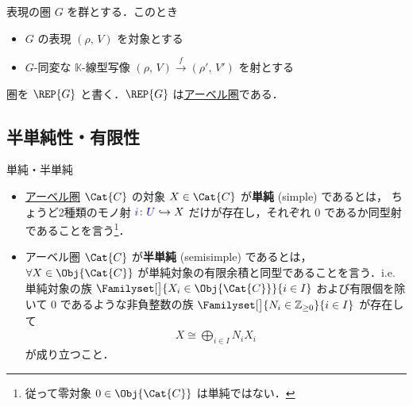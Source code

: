 \documentclass[TQFT_main]{subfiles}
\begin{document}
    \begin{myexample}[label=def:Rep]{表現の圏}
        $G$ を群とする．このとき
        \begin{itemize}
            \item $G$ の表現 $(\rho,\, V)$ を対象とする
            \item $G$-同変な $\mathbb{K}$-線型写像 $(\rho,\, V) \xrightarrow{f} (\rho',\, V')$ を射とする
        \end{itemize}
        圏を $\REP{G}$ と書く．$\REP{G}$ は\hyperref[def:additive-cat]{アーベル圏}である．
    \end{myexample}

    \subsection{半単純性・有限性}

    \begin{mydef}[label=def:semisimple-cat]{単純・半単純}
        \begin{itemize}
            \item \hyperref[def:additive-cat]{アーベル圏} $\Cat{C}$ の対象 $X \in \Cat{C}$ が\textbf{単純} (simple) であるとは，
            ちょうど2種類のモノ射 $\textcolor{blue}{i} \colon \textcolor{blue}{U} \hookrightarrow X$ だけが存在し，それぞれ $0$ であるか同型射であることを言う\footnote{従って零対象 $0 \in \Obj{\Cat{C}}$ は単純ではない．}．
            \item アーベル圏 $\Cat{C}$ が\textbf{半単純} (semisimple) であるとは，$\forall X \in \Obj{\Cat{C}}$ が単純対象の有限余積と同型であることを言う．i.e.
            単純対象の族 $\Familyset[\big]{X_i \in \Obj{\Cat{C}}}{i \in I}$ および有限個を除いて $0$ であるような非負整数の族 $\Familyset[\big]{N_i \in \mathbb{Z}_{\ge 0}}{i \in I}$ が存在して
            \begin{align}
                X \cong \bigoplus_{i \in I} N_i X_i
            \end{align}
            が成り立つこと．
        \end{itemize}
    \end{mydef}
\end{document}
